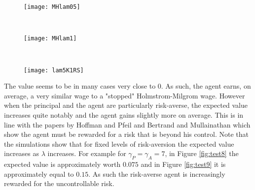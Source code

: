 \documentclass[numbook, envcountsect, envcountsame, envcountreset, runningheads, smallextended]{article}
\begin{document}
\begin{figure}[htb!]
\centering

\begin{minipage}{0.31\textwidth}
  \centering
  \texttt{[image: MHlam05]}
  \label{fig:test8}
\end{minipage}%
~
~
\begin{minipage}{0.31\textwidth}
  \centering
  \texttt{[image: MHlam1]}
  \label{fig:test9}
\end{minipage}%
~
~
\begin{minipage}{0.31\textwidth}
  \centering
  \texttt{[image: lam5K1RS]}
  \label{fig:test10}
\end{minipage}
\end{figure}

The value seems to be in many cases very close to 0. As such, the agent earns, on average, a very similar wage to a "stopped" Holmstrom-Milgrom wage. However when the principal and the agent are particularly risk-averse, the expected value increases quite notably and the agent gains slightly more on average. This is in line with the papers by Hoffman and Pfeil \cite{HoffmanPfeil} and Bertrand and Mullainathan \cite{Bertrand} which show the agent must be rewarded for a risk that is beyond his control. Note that the simulations show that for fixed levels of risk-aversion the expected value increases as $\lambda$ increases. For example for $\gamma_P=\gamma_A=7$, in Figure \ref{fig:test8} the expected value is approximately worth $0.075$ and in Figure \ref{fig:test9} it is approximately equal to $0.15$. As such the risk-averse agent is increasingly rewarded for the uncontrollable risk.  
\end{document}

